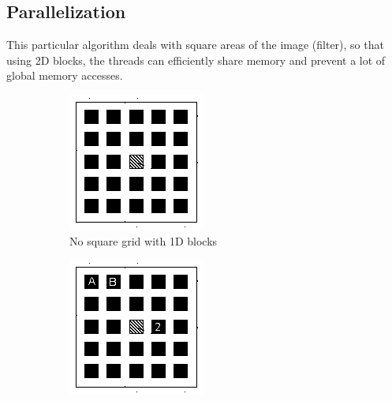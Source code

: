\documentclass[a4paper]{article}
\begin{document}
\subsection{Parallelization}
\label{sec:p2}
This particular algorithm deals with square areas of the image (filter), so that using 2D blocks, the threads can efficiently share memory and prevent a lot of global memory accesses.

\begin{figure}[!ht]
\begin{subfigure}{0.5\textwidth}
\centering
\includegraphics[width=\linewidth]{filter}
\caption{No square grid with 1D blocks}
\label{fig:ns1}
\end{subfigure} %
\begin{subfigure}{0.5\textwidth}
\centering
\includegraphics[width=\linewidth]{filter_letters}

\end{subfigure}
\end{figure}
\end{document}
